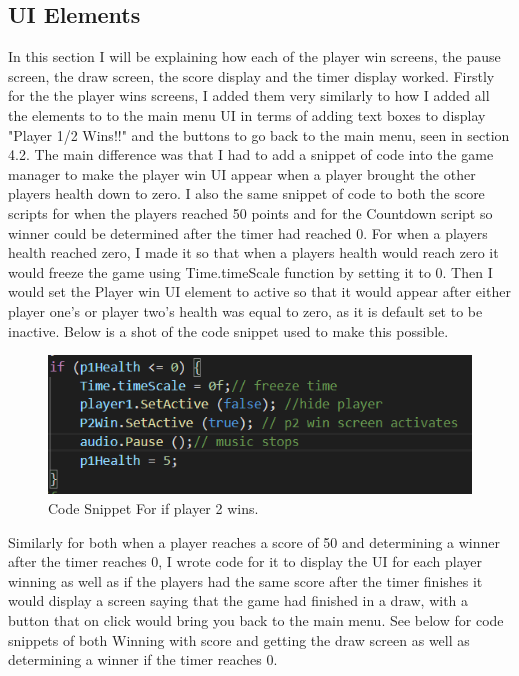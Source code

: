 \subsection{UI Elements}
In this section I will be explaining how each of the player win screens, the pause screen, the draw screen, the score display and the timer display worked. Firstly for the the player wins screens, I added them very similarly to how I added all the elements to to the main menu UI in terms of adding text boxes to display "Player 1/2 Wins!!" and the buttons to go back to the main menu, seen in section 4.2. The main difference was that I had to add a snippet of code into the game manager to make the player win UI appear when a player brought the other players health down to zero. I also the same snippet of code to both the score scripts for when the players reached 50 points and for  the Countdown script so winner could be determined after the timer had reached 0. For when a players health reached zero, I made it so that when a players health would reach zero it would freeze the game using Time.timeScale function by setting it to 0. Then I would set the Player win UI element to active so that it would appear after either player one's or player two's health was equal to zero, as it is default set to be inactive. Below is a shot of the code snippet used to make this possible.

\begin{figure}[h]
\centering
  \includegraphics[width= 0.7\linewidth]{Images/P2Wins.PNG}
  \caption{Code Snippet For if player 2 wins.}
  \label{fig:P2Win}
\end{figure}

Similarly for both when a player reaches a score of 50 and determining a winner after the timer reaches 0, I wrote code for it to display the UI for each player winning as well as if the players had the same score after the timer finishes it would display a screen saying that the game had finished in a draw, with a button that on click would bring you back to the main menu. See below for code snippets of both Winning with score and getting the draw screen as well as determining a winner if the timer reaches 0.

